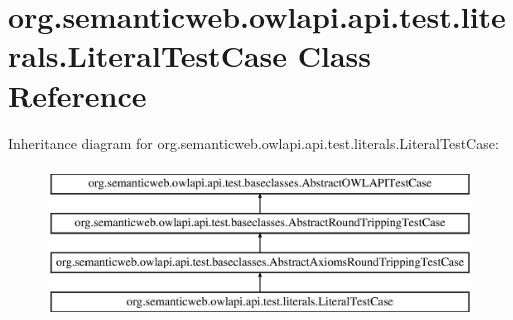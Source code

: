\hypertarget{classorg_1_1semanticweb_1_1owlapi_1_1api_1_1test_1_1literals_1_1_literal_test_case}{\section{org.\-semanticweb.\-owlapi.\-api.\-test.\-literals.\-Literal\-Test\-Case Class Reference}
\label{classorg_1_1semanticweb_1_1owlapi_1_1api_1_1test_1_1literals_1_1_literal_test_case}
}
Inheritance diagram for org.\-semanticweb.\-owlapi.\-api.\-test.\-literals.\-Literal\-Test\-Case\-:\begin{figure}[H]
\begin{center}
\leavevmode
\includegraphics[height=4.000000cm]{classorg_1_1semanticweb_1_1owlapi_1_1api_1_1test_1_1literals_1_1_literal_test_case}
\end{center}
\end{figure}
